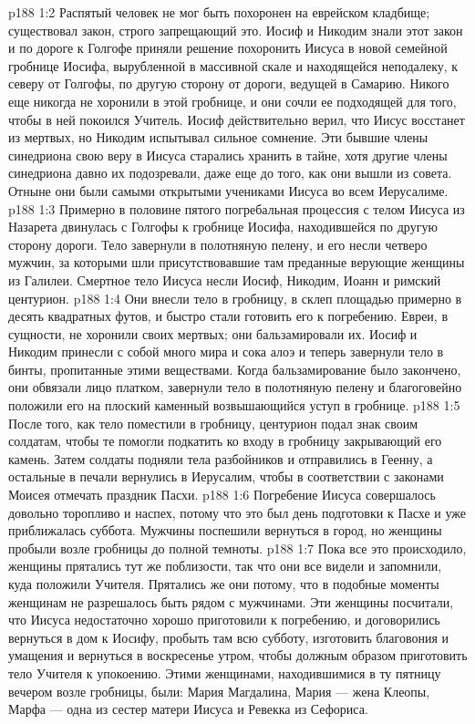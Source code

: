 \vs p188 1:2 Распятый человек не мог быть похоронен на еврейском кладбище; существовал закон, строго запрещающий это. Иосиф и Никодим знали этот закон и по дороге к Голгофе приняли решение похоронить Иисуса в новой семейной гробнице Иосифа, вырубленной в массивной скале и находящейся неподалеку, к северу от Голгофы, по другую сторону от дороги, ведущей в Самарию. Никого еще никогда не хоронили в этой гробнице, и они сочли ее подходящей для того, чтобы в ней покоился Учитель. Иосиф действительно верил, что Иисус восстанет из мертвых, но Никодим испытывал сильное сомнение. Эти бывшие члены синедриона свою веру в Иисуса старались хранить в тайне, хотя другие члены синедриона давно их подозревали, даже еще до того, как они вышли из совета. Отныне они были самыми открытыми учениками Иисуса во всем Иерусалиме.
\vs p188 1:3 Примерно в половине пятого погребальная процессия с телом Иисуса из Назарета двинулась с Голгофы к гробнице Иосифа, находившейся по другую сторону дороги. Тело завернули в полотняную пелену, и его несли четверо мужчин, за которыми шли присутствовавшие там преданные верующие женщины из Галилеи. Смертное тело Иисуса несли Иосиф, Никодим, Иоанн и римский центурион.
\vs p188 1:4 Они внесли тело в гробницу, в склеп площадью примерно в десять квадратных футов, и быстро стали готовить его к погребению. Евреи, в сущности, не хоронили своих мертвых; они бальзамировали их. Иосиф и Никодим принесли с собой много мира и сока алоэ и теперь завернули тело в бинты, пропитанные этими веществами. Когда бальзамирование было закончено, они обвязали лицо платком, завернули тело в полотняную пелену и благоговейно положили его на плоский каменный возвышающийся уступ в гробнице.
\vs p188 1:5 После того, как тело поместили в гробницу, центурион подал знак своим солдатам, чтобы те помогли подкатить ко входу в гробницу закрывающий его камень. Затем солдаты подняли тела разбойников и отправились в Геенну, а остальные в печали вернулись в Иерусалим, чтобы в соответствии с законами Моисея отмечать праздник Пасхи.
\vs p188 1:6 Погребение Иисуса совершалось довольно торопливо и наспех, потому что это был день подготовки к Пасхе и уже приближалась суббота. Мужчины поспешили вернуться в город, но женщины пробыли возле гробницы до полной темноты.
\vs p188 1:7 Пока все это происходило, женщины прятались тут же поблизости, так что они все видели и запомнили, куда положили Учителя. Прятались же они потому, что в подобные моменты женщинам не разрешалось быть рядом с мужчинами. Эти женщины посчитали, что Иисуса недостаточно хорошо приготовили к погребению, и договорились вернуться в дом к Иосифу, пробыть там всю субботу, изготовить благовония и умащения и вернуться в воскресенье утром, чтобы должным образом приготовить тело Учителя к упокоению. Этими женщинами, находившимися в ту пятницу вечером возле гробницы, были: Мария Магдалина, Мария --- жена Клеопы, Марфа --- одна из сестер матери Иисуса и Ревекка из Сефориса.
